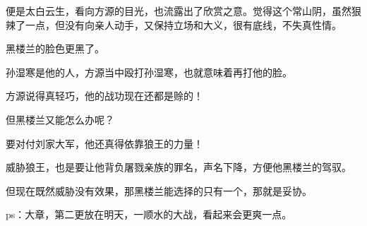 \begin{this_body}
便是太白云生，看向方源的目光，也流露出了欣赏之意。觉得这个常山阴，虽然狠辣了一点，但没有向亲人动手，又保持立场和大义，很有底线，不失真性情。

黑楼兰的脸色更黑了。

孙湿寒是他的人，方源当中殴打孙湿寒，也就意味着再打他的脸。

方源说得真轻巧，他的战功现在还都是赊的！

但黑楼兰又能怎么办呢？

要对付刘家大军，他还真得依靠狼王的力量！

威胁狼王，也是要让他背负屠戮亲族的罪名，声名下降，方便他黑楼兰的驾驭。

但现在既然威胁没有效果，那黑楼兰能选择的只有一个，那就是妥协。

ps：大章，第二更放在明天，一顺水的大战，看起来会更爽一点。

\end{this_body}

